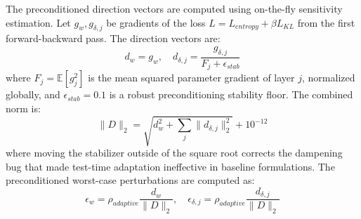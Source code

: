 \documentclass{article}
\theoremstyle{plain}
\theoremstyle{definition}
\theoremstyle{remark}
\begin{document}
The preconditioned direction vectors are computed using on-the-fly sensitivity estimation. Let $g_w, g_{\delta, j}$ be gradients of the loss $L = L_{entropy} + \beta L_{KL}$ from the first forward-backward pass. The direction vectors are:
\begin{equation}
  d_w = g_w, \quad d_{\delta, j} = \frac{g_{\delta, j}}{F_j + \epsilon_{stab}}
\end{equation}
where $F_j = \mathbb{E}[g_j^2]$ is the mean squared parameter gradient of layer $j$, normalized globally, and $\epsilon_{stab} = 0.1$ is a robust preconditioning stability floor.
The combined norm is:
\begin{equation}
  \|D\|_2 = \sqrt{d_w^2 + \sum_{j} \|d_{\delta, j}\|^2_2} + 10^{-12}
\end{equation}
where moving the stabilizer outside of the square root corrects the dampening bug that made test-time adaptation ineffective in baseline formulations.
The preconditioned worst-case perturbations are computed as:
\begin{equation}
  \epsilon_w = \rho_{adaptive} \frac{d_w}{\|D\|_2}, \quad \epsilon_{\delta, j} = \rho_{adaptive} \frac{d_{\delta, j}}{\|D\|_2}
\end{equation}
\end{document}
